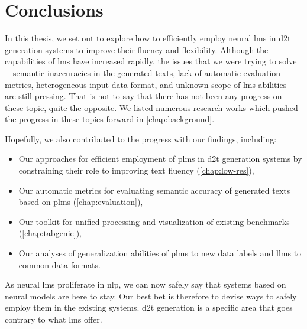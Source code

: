 
\chapter{Conclusions}
\label{chap:conclusions}

In this thesis, we set out to explore how to efficiently employ neural \acp{lm} in \ac{d2t} generation systems 
to improve their fluency and flexibility. 
Although the capabilities of \acp{lm} have increased rapidly, the issues that we were trying to solve---semantic inaccuracies in the generated texts, lack of automatic evaluation metrics, heterogeneous input data format, and unknown scope of \acp{lm} abilities---are still pressing. That is not to say that there has not been any progress on these topic, quite the opposite. We listed numerous research works which pushed the progress in these topics forward in \autoref{chap:background}.


Hopefully, we also contributed to the progress with our findings, including:
\begin{itemize}
    \item Our approaches for efficient employment of \acp{plm} in \ac{d2t} generation systems by constraining their role to improving text fluency (\autoref{chap:low-res}),
    \item Our automatic metrics for evaluating semantic accuracy of generated texts based on \acp{plm} (\autoref{chap:evaluation}),
    \item Our toolkit for unified processing and visualization of existing benchmarks (\autoref{chap:tabgenie}),
    \item Our analyses of generalization abilities of \acp{plm} to new data labels and \acp{llm} to common data formats.
\end{itemize}

As neural \acp{lm} proliferate in \ac{nlp}, we can now safely say that systems based on neural models are here to stay. Our best bet is therefore to devise ways to safely employ them in the existing systems. \ac{d2t} generation is a specific area that goes contrary to what \acp{lm} offer.